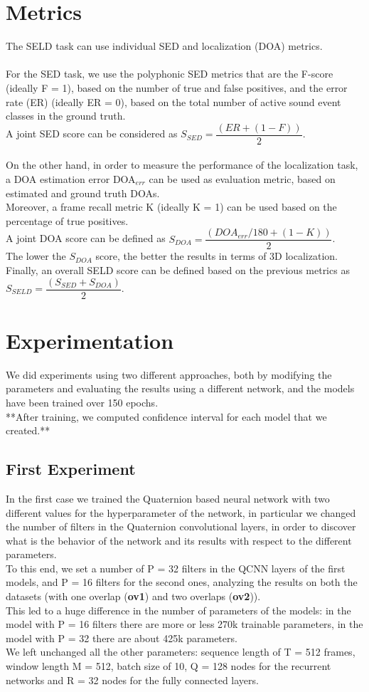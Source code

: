 \documentclass{article}
\begin{document}
    \section{Metrics}
    The SELD task can use individual SED and localization (DOA) metrics.
    \\ \\ For the SED task, we use the polyphonic SED metrics that are the F-score (ideally F = 1), based on the number of true and false positives, and the error rate (ER) (ideally ER = 0), based on the total number of active sound event classes in the ground truth.\\
    A joint SED score can be considered as $S_{SED} = \dfrac{(ER+(1-F))}{2}$.
    \\ \\ On the other hand, in order to measure the performance of the localization task, a DOA estimation error DOA$_{err}$ can be used as evaluation metric, based on estimated and ground truth DOAs.\\ Moreover, a frame recall metric K (ideally K = 1) can be used based on the percentage of true positives. \\
    A joint DOA score can be defined as $S_{DOA} = \dfrac{(DOA_{err}/180 + (1 - K))}{2}$.\\
    The lower the $S_{DOA}$ score, the better the results in terms of 3D localization.
    Finally, an overall SELD score can be defined based on the previous metrics as $S_{SELD} = \dfrac{(S_{SED} + S_{DOA})}{2}$.
    \section{Experimentation}
    We did experiments using two different approaches, both by modifying the parameters and evaluating the results using a different network, and the models have been trained over 150 epochs.\\
    **After training, we computed confidence interval for each model that we created.**
    \subsection*{First Experiment}
    In the first case we trained the Quaternion based neural network with two different values for the hyperparameter of the network, in particular we changed the number of filters in the Quaternion convolutional layers, in order to discover what is the behavior of the network and its results with respect to the different parameters.\\
    To this end, we set a number of P = 32 filters in the QCNN layers of the first models, and P = 16 filters for the second ones, analyzing the results on both the datasets (with one overlap (\textbf{ov1}) and two overlaps (\textbf{ov2})).\\
    This led to a huge difference in the number of parameters of the models: in the model with P = 16 filters there are more or less 270k trainable parameters, in the model with P = 32 there are about 425k parameters.\\
    We left unchanged all the other parameters: sequence length of T = 512 frames, window length M = 512, batch size of 10, Q = 128 nodes for the recurrent networks and R = 32 nodes for the fully connected layers.
\end{document}
